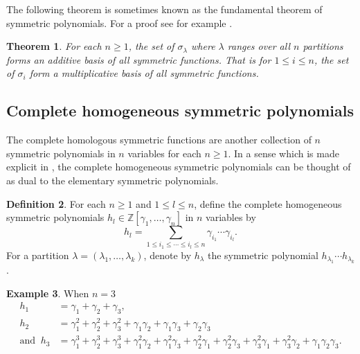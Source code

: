 \documentclass{article}
\theoremstyle{plain}
\newtheorem{thm}{Theorem}[section]
\theoremstyle{definition}
\newtheorem{defn}[thm]{Definition}
\newtheorem{exam}[thm]{Example}
\numberwithin{thm}{section}
\begin{document}
		The following theorem is sometimes known as the fundamental theorem of symmetric polynomials.
		For a proof see for example \cite[\S $7.4$]{ECstanly}.
		
		\begin{thm}\label{thm:FunThmSym}
			For each $n\geq 1$, the set of $\sigma_\lambda$ where $\lambda$ ranges over all $n$ partitions forms an additive basis of all symmetric functions.
			That is for $1\leq i \leq n$,  the set of $\sigma_i$ form a multiplicative basis of  all symmetric functions.
		\end{thm}

 	
	\subsection{Complete homogeneous symmetric polynomials}\label{sec:homogeneous}
	
		The complete homologous symmetric functions are another collection of $n$ symmetric polynomials in $n$ variables for each $n\geq 1$.
		In a sense which is made explicit in \cite[\S $7.6$]{ECstanly},
		the complete homogeneous symmetric polynomials can be thought of as dual to the elementary symmetric polynomials.
		
		\begin{defn}\label{defn:CompleteHomogeneous}
			For each $n\geq 1$ and $1\leq l \leq n$, define the complete homogeneous symmetric polynomials $h_l\in\mathbb{Z}[\gamma_1,\dots,\gamma_n]$ in $n$ variables by
			\begin{equation*}
				h_l=\sum_{1\leq i_1\leq\cdots\leq i_l\leq n}{\gamma_{i_1}\cdots\gamma_{i_l}}.
			\end{equation*}
			For a partition $\lambda=(\lambda_1,\dots,\lambda_k)$, denote by $h_\lambda$ the symmetric polynomial $h_{\lambda_1}\cdots h_{\lambda_k}$.
		\end{defn}
		
		\begin{exam}
			When $n=3$
			\begin{align*}
											h_1&=\gamma_1+\gamma_2+\gamma_3,\\
											h_2&=\gamma_1^2+\gamma_2^2+\gamma_3^2+\gamma_1\gamma_2+\gamma_1\gamma_3+\gamma_2\gamma_3\\
				\text{and}\;\;h_3&=\gamma_1^3+\gamma_2^3+\gamma_3^3+
																\gamma_1^2\gamma_2+\gamma_1^2\gamma_3+\gamma_2^2\gamma_1+\gamma_2^2\gamma_3+\gamma_3^2\gamma_1+\gamma_3^2\gamma_2+\gamma_1\gamma_2\gamma_3.
			\end{align*}
		\end{exam}
		
\end{document}

